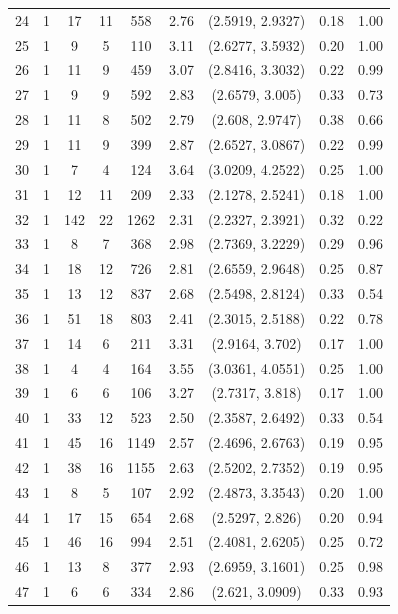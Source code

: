 \documentclass{article}
\begin{document}
\begin{appendices}
\begin{longtable}{ccccccccc}
24 &   1 &  17 &  11 & 558 & 2.76 & (2.5919, 2.9327) & 0.18 & 1.00 \\ 
25 &   1 &   9 &   5 & 110 & 3.11 & (2.6277, 3.5932) & 0.20 & 1.00 \\ 
26 &   1 &  11 &   9 & 459 & 3.07 & (2.8416, 3.3032) & 0.22 & 0.99 \\ 
27 &   1 &   9 &   9 & 592 & 2.83 & (2.6579, 3.005) & 0.33 & 0.73 \\ 
28 &   1 &  11 &   8 & 502 & 2.79 & (2.608, 2.9747) & 0.38 & 0.66 \\ 
29 &   1 &  11 &   9 & 399 & 2.87 & (2.6527, 3.0867) & 0.22 & 0.99 \\ 
30 &   1 &   7 &   4 & 124 & 3.64 & (3.0209, 4.2522) & 0.25 & 1.00 \\ 
31 &   1 &  12 &  11 & 209 & 2.33 & (2.1278, 2.5241) & 0.18 & 1.00 \\ 
32 &   1 & 142 &  22 & 1262 & 2.31 & (2.2327, 2.3921) & 0.32 & 0.22 \\ 
33 &   1 &   8 &   7 & 368 & 2.98 & (2.7369, 3.2229) & 0.29 & 0.96 \\ 
34 &   1 &  18 &  12 & 726 & 2.81 & (2.6559, 2.9648) & 0.25 & 0.87 \\ 
35 &   1 &  13 &  12 & 837 & 2.68 & (2.5498, 2.8124) & 0.33 & 0.54 \\ 
36 &   1 &  51 &  18 & 803 & 2.41 & (2.3015, 2.5188) & 0.22 & 0.78 \\ 
37 &   1 &  14 &   6 & 211 & 3.31 & (2.9164, 3.702) & 0.17 & 1.00 \\ 
38 &   1 &   4 &   4 & 164 & 3.55 & (3.0361, 4.0551) & 0.25 & 1.00 \\ 
39 &   1 &   6 &   6 & 106 & 3.27 & (2.7317, 3.818) & 0.17 & 1.00 \\ 
40 &   1 &  33 &  12 & 523 & 2.50 & (2.3587, 2.6492) & 0.33 & 0.54 \\ 
41 &   1 &  45 &  16 & 1149 & 2.57 & (2.4696, 2.6763) & 0.19 & 0.95 \\ 
42 &   1 &  38 &  16 & 1155 & 2.63 & (2.5202, 2.7352) & 0.19 & 0.95 \\ 
43 &   1 &   8 &   5 & 107 & 2.92 & (2.4873, 3.3543) & 0.20 & 1.00 \\ 
44 &   1 &  17 &  15 & 654 & 2.68 & (2.5297, 2.826) & 0.20 & 0.94 \\ 
45 &   1 &  46 &  16 & 994 & 2.51 & (2.4081, 2.6205) & 0.25 & 0.72 \\ 
46 &   1 &  13 &   8 & 377 & 2.93 & (2.6959, 3.1601) & 0.25 & 0.98 \\ 
47 &   1 &   6 &   6 & 334 & 2.86 & (2.621, 3.0909) & 0.33 & 0.93 \\ 

\end{longtable}
\end{appendices}
\end{document}
